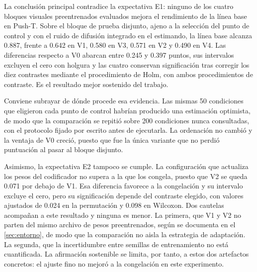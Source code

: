 
La conclusi\'on principal contradice la expectativa E1: ninguno de los cuatro bloques
visuales preentrenados evaluados mejora el rendimiento de la l\'inea base en Push-T. Sobre
el bloque de prueba disjunto, ajeno a la selecci\'on del punto de control y con el ruido de
difusi\'on integrado en el estimando, la l\'inea base alcanza \num{0.887}, frente a
\num{0.642} en V1, \num{0.580} en V3, \num{0.571} en V2 y \num{0.490} en V4. Las diferencias
respecto a V0 abarcan entre \num{0.245} y \num{0.397} puntos, sus intervalos excluyen el
cero con holgura y las cuatro conservan significaci\'on tras corregir los diez contrastes
mediante el procedimiento de Holm, con ambos procedimientos de contraste. Es el resultado
mejor sostenido del trabajo.

Conviene subrayar de d\'onde procede esa evidencia. Las mismas \num{50} condiciones que
eligieron cada punto de control habr\'ian producido una estimaci\'on optimista, de modo que
la comparaci\'on se repiti\'o sobre \num{200} condiciones nunca consultadas, con el
protocolo fijado por escrito antes de ejecutarla. La ordenaci\'on no cambi\'o y la ventaja
de V0 creci\'o, puesto que fue la \'unica variante que no perdi\'o puntuaci\'on al pasar al
bloque disjunto.

Asimismo, la expectativa E2 tampoco se cumple. La configuraci\'on que actualiza los pesos
del codificador no supera a la que los congela, puesto que V2 se queda \num{0.071} por
debajo de V1. Esa diferencia favorece a la congelaci\'on y su intervalo excluye el cero,
pero su significaci\'on depende del contraste elegido, con valores ajustados de \num{0.024}
en la permutaci\'on y \num{0.098} en Wilcoxon. Dos cautelas acompa\~nan a
este resultado y ninguna es menor. La primera, que V1 y V2 no parten del mismo archivo de
pesos preentrenados, seg\'un se documenta en el \cref{sec:entorno}, de modo que la
comparaci\'on no aisla la estrategia de adaptaci\'on. La segunda, que la incertidumbre
entre semillas de entrenamiento no est\'a cuantificada. La afirmaci\'on sostenible se
limita, por tanto, a estos dos artefactos concretos: el ajuste fino no mejor\'o a la
congelaci\'on en este experimento.

